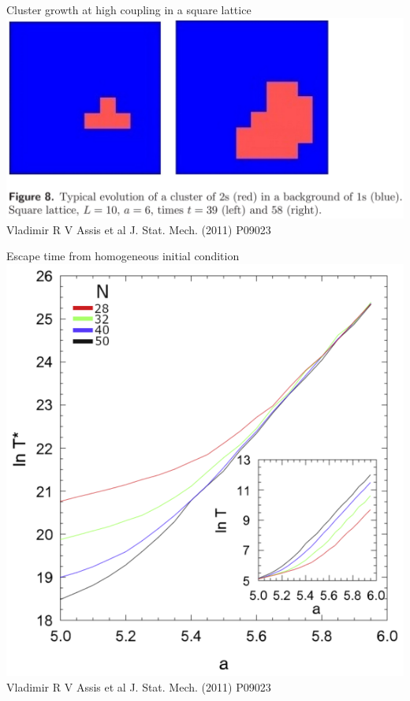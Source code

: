 \documentclass[serif,mathserif]{beamer}
\begin{document}
\begin{frame}
    \centering
    Cluster growth at high coupling in a square lattice\\
    \vspace{0.8cm}
    \includegraphics[height=0.6\textheight]{./nucleation.eps}\\
    Vladimir R V Assis et al J. Stat. Mech. (2011) P09023
\end{frame}

\begin{frame}
    \centering
    Escape time from homogeneous initial condition\\
    \vspace{0.8cm}
    \includegraphics[height=0.75\textheight]{./escapetime.eps}\\
    Vladimir R V Assis et al J. Stat. Mech. (2011) P09023
\end{frame}
\end{document}
